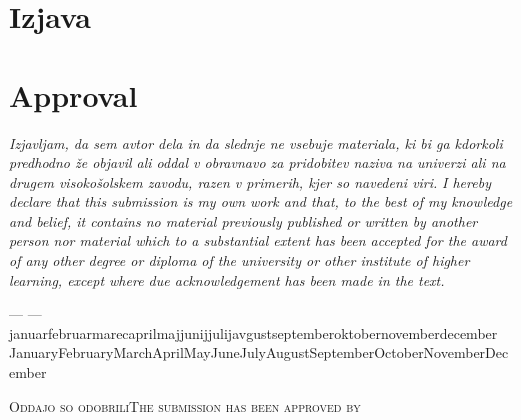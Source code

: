 \makeatletter

  \if@slovene
   \chapter*{Izjava}
  \else
   \chapter*{Approval}
  \fi
  \thispagestyle{empty}

  \begin{centering}
  \if@slovene
\emph{Izjavljam, da sem avtor dela in da slednje ne vsebuje materiala, ki bi ga kdorkoli predhodno že objavil ali oddal v obravnavo za pridobitev naziva na univerzi ali na drugem visokošolskem zavodu, razen v primerih, kjer so navedeni viri.}
  \else
\emph{I hereby declare that this submission is my own work and that, to the best of my knowledge and belief, it contains no material previously published or written by another person nor material which to a substantial extent has been accepted for the award of any other degree or diploma of the university or other institute of higher learning, except where due acknowledgement has been made in the text.}
  \fi

   --- \@author{} ---\\
  \if@slovene
   \ifcase\@month\or januar\or februar\or marec\or april\or maj\or junij\or julij\or avgust\or september\or oktober\or november\or december\fi
  \else
   \ifcase\@month\or January\or February\or March\or April\or May\or June\or July\or August\or September\or October\or November\or December\fi
  \fi 
  ~\number\@year
  \vspace*{\baselineskip}

  \if@slovene\textsc{Oddajo so odobrili}\else\textsc{The submission has been approved by}\fi
  \vspace*{.5\baselineskip}
  
  \ifx\@approvedByNameA\empty\relax\else\@approvedByNameA\\\fi
  \ifx\@approvedByTitleA\empty\relax\else{\small\emph{\@approvedByTitleA}}\\\fi
  \ifx\@approvedByRoleA\empty\relax\else\textsc{\@approvedByRoleA}\\\fi
  \ifx\@approvedByAffiliationA\empty\relax\else\@approvedByAffiliationA\fi
  \vspace*{.5\baselineskip}
  
  \ifx\@approvedByNameB\empty\relax\else\@approvedByNameB\\\fi
  \ifx\@approvedByTitleB\empty\relax\else{\small\emph{\@approvedByTitleB}}\\\fi
  \ifx\@approvedByRoleB\empty\relax\else\textsc{\@approvedByRoleB}\\\fi
  \ifx\@approvedByAffiliationB\empty\relax\else\@approvedByAffiliationB\fi
  \vspace*{.5\baselineskip}


\end{centering}
